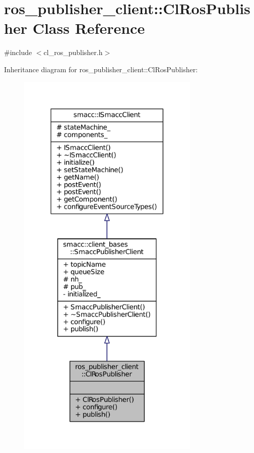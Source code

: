 \hypertarget{classros__publisher__client_1_1ClRosPublisher}{}\section{ros\+\_\+publisher\+\_\+client\+:\+:Cl\+Ros\+Publisher Class Reference}
\label{classros__publisher__client_1_1ClRosPublisher}


{\ttfamily \#include $<$cl\+\_\+ros\+\_\+publisher.\+h$>$}



Inheritance diagram for ros\+\_\+publisher\+\_\+client\+:\+:Cl\+Ros\+Publisher\+:
\nopagebreak
\begin{figure}[H]
\begin{center}
\leavevmode
\includegraphics[width=247pt]{classros__publisher__client_1_1ClRosPublisher__inherit__graph}
\end{center}
\end{figure}


